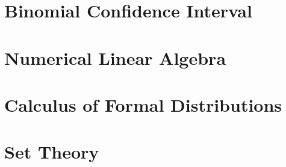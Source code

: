 \documentclass{article}
\begin{document}
\section{Binomial Confidence Interval}


\section{Numerical Linear Algebra}



\section{Calculus of Formal Distributions}


\vfill\eject
\appendix
\section{Set Theory}


\end{document}

